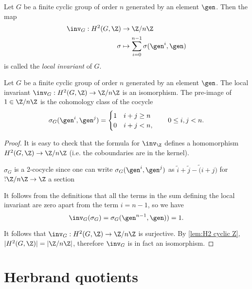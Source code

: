 \begin{definition} \label{def:local inv}
	\leanok

	Let $G$ be a finite cyclic group of order $n$ generated by an element $\gen$.
	Then the map
	\begin{align*}
		\inv_G : H^2(G,\Z) & \to \Z/n\Z \\
		\sigma & \mapsto \sum_{i=0}^{n-1} \sigma(\gen^i,\gen)
	\end{align*}
	is called the \emph{local invariant} of $G$.
\end{definition}


\begin{lemma} \label{lem:local inv iso}
	\leanok

	Let $G$ be a finite cyclic group of order $n$ generated by an element $\gen$.
	The local invariant $\inv_G : H^2(G,\Z) \to \Z/n\Z$ is an isomorphism.
	The pre-image of $1 \in \Z/n\Z$ is the cohomology class of the cocycle
	\[
		\sigma_G (\gen^i, \gen^j) = \begin{cases}
			1 & i+j \ge n \\
			0 & i+j < n,
		\end{cases}
		\qquad 0 \le i,j < n.
	\]
\end{lemma}

\begin{proof}
	\leanok

	It is easy to check that the formula for $\inv_\Z$ defines a homomorphism
	$H^2(G,\Z) \to \Z / n \Z$ (i.e. the coboundaries are in the kernel).

	$\sigma_G$ is a 2-cocycle since one can write $\sigma_G(\gen^i, \gen^j)$ as
	$\tilde i + \tilde j - \tilde(i + j)$ for $\tilde : \Z/n\Z \to \Z$ a section

	It follows from the definitions that all the terms in the sum defining the local invariant are
	zero apart from the term $i=n-1$, so we have
	\[
		\inv_G(\sigma_G)
		= \sigma_G(\gen^{n-1}, \gen))
		= 1.
	\]

	It follows that $\inv_G : H^2(G,\Z) \to \Z/n\Z$ is surjective.
	By \ref{lem:H2 cyclic Z}, $|H^2(G,\Z)| = |\Z/n\Z|$, therefore $\inv_G$ is in fact an isomorphism.
\end{proof}





\section{Herbrand quotients}

